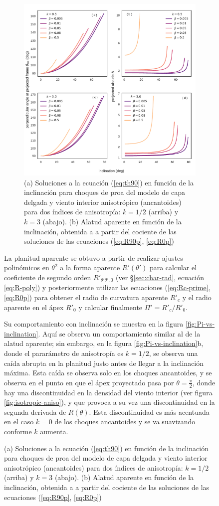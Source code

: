 \begin{figure}
\begin{figure}
  \centering
  \includegraphics[width=\linewidth]{./Figures/ancantoid-th90-vs-i}
  \caption[$\theta_{90}$ y alatud aparente en función de la inclinación para choques ancantoides.]{(a) Soluciones a la ecuación (\ref{eq:th90}) en función de la inclinación para choques de proa del modelo de capa delgada y viento interior anisotrópico (ancantoides) para dos índices de anisotropía: $k=1/2$ (arriba) y $k=3$ (abajo). (b) Alatud aparente en función de la inclinación, obtenida a a partir del cociente de las soluciones de las ecuaciones (\ref{eq:R90p}, \ref{eq:R0p})}
  \label{fig:t90-anisotropic}
\end{figure}

La planitud aparente se obtuvo a partir de realizar ajustes polinómicos en $\theta^2$ a la forma aparente $R'(\theta')$ para calcular el coeficiente de segundo orden $R'_{\theta'\theta', 0}$ (ver \S \ref{sec:char-rad}, ecuación \ref{eq:R-poly}) y posteriormente utilizar las ecuaciones (\ref{eq:Rc-prime}, \ref{eq:R0p}) para obtener el radio de curvatura aparente $R'_c$ y el radio aparente en el ápex $R'_0$ y calcular finalmente $\Pi'= R'_c/R'_0$. 

Su comportamiento con inclinación se muestra en la figura \ref{fig:Pi-vs-inclination}. Aquí se observa un comportamiento similar al de la alatud aparente; sin embargo, en la figura \ref{fig:Pi-vs-inclination}b, donde el pararámetro de anisotropía es $k=1/2$, se observa una caída abrupta en la planitud justo antes de llegar a la inclinación máxima. Esta caída se observa solo en los choques ancantoides, y se observa en el punto en que el ápex proyectado pasa por $\theta = \frac{\pi}{2}$, donde hay una discontinuidad en la densidad del viento interior (ver figura \ref{fig:isotropic-aniso}), y que provoca a su vez una discontinuidad en la segunda derivada de $R(\theta)$. Esta discontinuidad es más acentuada en el caso $k=0$ de los choques ancantoides y se va suavizando conforme $k$ aumenta.


\end{figure}
